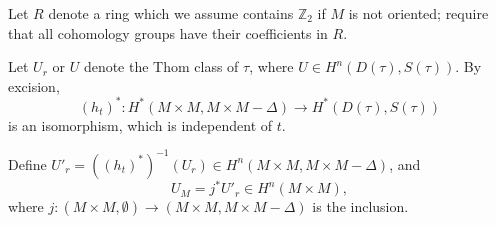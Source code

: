 Let $R$ denote a ring which we assume contains $\mathbb{Z}_2$ if $M$ is not oriented; require that all cohomology groups have their coefficients in $R$.

Let $U_r$ or $U$ denote the Thom class of $\tau$, where $U \in H^n(D(\tau), S(\tau))$. By excision,
$$(h_t)^*: H^*(M \times M, M \times M - \Delta) \to H^*(D(\tau), S(\tau))$$
is an isomorphism, which is independent of $t$.

Define $U'_r = ((h_t)^*)^{-1}(U_r) \in H^n(M \times M, M \times M - \Delta)$, and
$$U_M = j^* U'_r \in H^n(M \times M),$$
where $j: (M \times M, \emptyset) \to (M \times M, M \times M - \Delta)$ is the inclusion.
